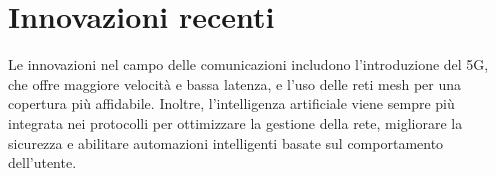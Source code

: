 \section{Innovazioni recenti}
Le innovazioni nel campo delle comunicazioni includono l'introduzione del 5G, che offre maggiore velocità e bassa latenza, e l'uso delle reti mesh per una copertura più affidabile. Inoltre, l'intelligenza artificiale viene sempre più integrata nei protocolli per ottimizzare la gestione della rete, migliorare la sicurezza e abilitare automazioni intelligenti basate sul comportamento dell'utente.

